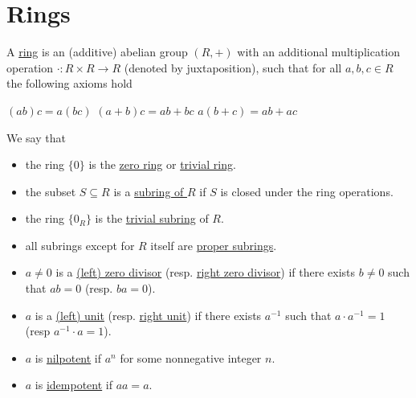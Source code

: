 \section{Rings}\label{sec:rings}

\begin{definition}\label{def:ring}
  A \uline{ring} is an (additive) abelian group $(R, +)$ with an additional multiplication operation $\cdot: R \times R \to R$ (denoted by juxtaposition), such that for all $a, b, c \in R$ the following axioms hold
  \begin{description}
     $(ab)c = a(bc)$
     $(a + b)c = ab + bc$
     $a(b + c) = ab + ac$
  \end{description}

  We say that
  \begin{itemize}
    \item\label{def:ring/trivial_group} the ring $\{ 0 \}$ is the \uline{zero ring} or \uline{trivial ring}.
    \item\label{def:ring/subring} the subset $S \subseteq R$ is a \uline{subring of $R$} if $S$ is closed under the ring operations.
    \item\label{def:ring/trivial_subgroup} the ring $\{ 0_R \}$ is the \uline{trivial subring} of $R$.
    \item\label{def:ring/proper_subring} all subrings except for $R$ itself are \uline{proper subrings}.
    \item\label{def:ring/zero_divisor} $a \neq 0$ is a \uline{(left) zero divisor} (resp. \uline{right zero divisor}) if there exists $b \neq 0$ such that $ab = 0$ (resp. $ba = 0$).
    \item\label{def:ring/unit} $a$ is a \uline{(left) unit} (resp. \uline{right unit}) if there exists $a^{-1}$ such that $a \cdot a^{-1} = 1$ (resp $a^{-1} \cdot a = 1$).
    \item\label{def:ring/nilpotent_element} $a$ is \uline{nilpotent} if $a^n$ for some nonnegative integer $n$.
    \item\label{def:ring/idempotent_element} $a$ is \uline{idempotent} if $aa = a$.
  \end{itemize}


\end{definition}

